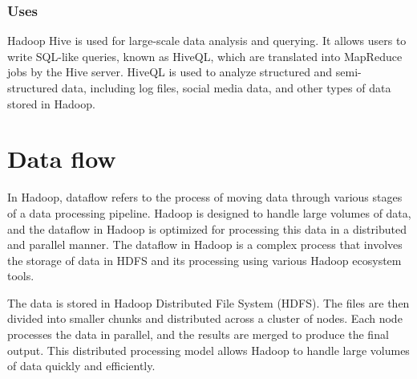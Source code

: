 \documentclass[12pt]{article}
\begin{document}
\subsubsection{Uses}
Hadoop Hive is used for large-scale data analysis and querying. It allows users to write SQL-like queries, known as HiveQL, which are translated into MapReduce jobs by the Hive server. HiveQL is used to analyze structured and semi-structured data, including log files, social media data, and other types of data stored in Hadoop.

\section{Data flow}
In Hadoop, dataflow refers to the process of moving data through various stages of a data processing pipeline. Hadoop is designed to handle large volumes of data, and the dataflow in Hadoop is optimized for processing this data in a distributed and parallel manner. The dataflow in Hadoop is a complex process that involves the storage of data in HDFS and its processing using various Hadoop ecosystem tools.

The data is stored in Hadoop Distributed File System (HDFS). The files are then divided into smaller chunks and distributed across a cluster of nodes. Each node processes the data in parallel, and the results are merged to produce the final output. This distributed processing model allows Hadoop to handle large volumes of data quickly and efficiently.
\end{document}
